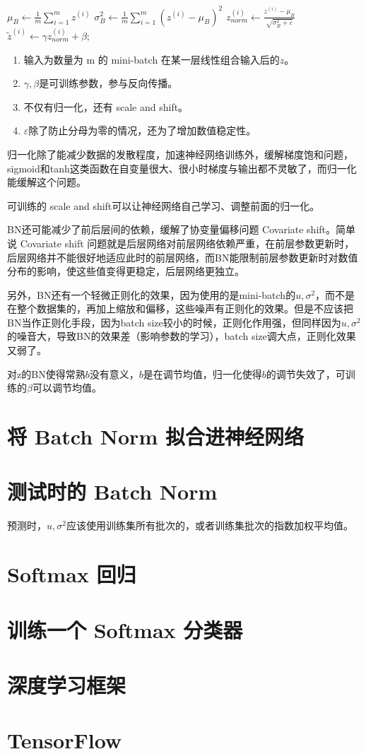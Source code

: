 \documentclass[../../main.tex]{subfiles}
\begin{document}
\begin{algorithm}[H]
    \(μ_B← \frac{1}{m}\sum\limits_{i=1}^{m}z^{(i)}\)\;
    \(σ_B^2← \frac{1}{m}\sum\limits_{i=1}^{m}(z^{(i)} - μ_B)^2\)\;
    \(z_{norm}^{(i)} ← \frac{z^{(i)}-μ_B}{\sqrt{σ_B^2+ε}}\)\;
    \(\tilde{z}^{(i)} ← γz_{norm}^{(i)} + β\); 
\end{algorithm}
\begin{enumerate}
    \item 输入为数量为 m 的 mini-batch 在某一层线性组合输入后的\(z\)。
    \item \(γ, β\)是可训练参数，参与反向传播。
    \item 不仅有归一化，还有 scale and shift。
    \item \(ε\)除了防止分母为零的情况，还为了增加数值稳定性。
\end{enumerate}

归一化除了能减少数据的发散程度，加速神经网络训练外，缓解梯度饱和问题，sigmoid和tanh这类函数在自变量很大、很小时梯度与输出都不灵敏了，而归一化能缓解这个问题。

可训练的 scale and shift可以让神经网络自己学习、调整前面的归一化。

BN还可能减少了前后层间的依赖，缓解了协变量偏移问题 Covariate shift。简单说 Covariate shift 问题就是后层网络对前层网络依赖严重，在前层参数更新时，后层网络并不能很好地适应此时的前层网络，而BN能限制前层参数更新时对数值分布的影响，使这些值变得更稳定，后层网络更独立。

另外，BN还有一个轻微正则化的效果，因为使用的是mini-batch的\(u, σ^2\)，而不是在整个数据集的，再加上缩放和偏移，这些噪声有正则化的效果。但是不应该把BN当作正则化手段，因为batch size较小的时候，正则化作用强，但同样因为\(u, σ^2\)的噪音大，导致BN的效果差（影响参数的学习），batch size调大点，正则化效果又弱了。

对z的BN使得常熟\(b\)没有意义，\(b\)是在调节均值，归一化使得\(b\)的调节失效了，可训练的\(β\)可以调节均值。

\section{将 Batch Norm 拟合进神经网络}

\section{测试时的 Batch Norm}
预测时，\(u, σ^2\)应该使用训练集所有批次的，或者训练集批次的指数加权平均值。

\section{Softmax 回归}

\section{训练一个 Softmax 分类器}

\section{深度学习框架}

\section{TensorFlow}
\end{document}
